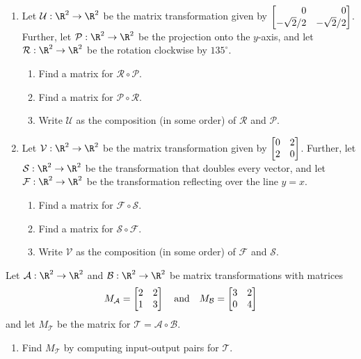 \begin{exercises}
	\begin{problist}
		\prob 
		\begin{enumerate}
			\item Let $\mathcal U:\R^{2}\to\R^{2}$ be the matrix transformation
				given by $\mat{0&0\\-\sqrt{2}/2 & -\sqrt{2}/2}$.
				Further, let $\mathcal P:\R^{2}\to\R^{2}$ be the
				projection onto the $y$-axis, and let $\mathcal R:\R^{2}\to\R^{2}$
				be the rotation clockwise by $135^{\circ}$.
				\begin{enumerate}
					\item Find a matrix for $\mathcal R \circ \mathcal P$.

					\item Find a matrix for $\mathcal P \circ \mathcal R$.

					\item Write $\mathcal U$ as the composition
						(in some order) of $\mathcal R$ and
						$\mathcal P$.
				\end{enumerate}

			\item Let $\mathcal V:\R^{2}\to\R^{2}$ be the matrix transformation
				given by $\mat{0&2\\2&0}$.
				Further, let $\mathcal S:\R^{2}\to\R^{2}$ be the
				transformation that doubles every vector, and let
				$\mathcal F:\R^{2}\to\R^{2}$ be the
				transformation reflecting over the line $y=x$.
				\begin{enumerate}
					\item Find a matrix for $\mathcal F \circ \mathcal S$.

					\item Find a matrix for $\mathcal S \circ \mathcal F$.

					\item Write $\mathcal V$ as the composition
						(in some order) of $\mathcal F$ and
						$\mathcal S$.
				\end{enumerate}
		\end{enumerate}

		\prob Let $\mathcal A: \R^{2} \to \R^{2}$ and
		$\mathcal B: \R^{2} \to \R^{2}$ be matrix transformations with
		matrices
		\[
			M_{\mathcal A}= \mat{2&2\\1&3}\quad \text{and} \quad M_{\mathcal
			B}= \mat{3&2\\0&4}
		\]
		 and let $M_{\mathcal T}$ be the matrix for $\mathcal T=\mathcal A\circ\mathcal B$.
		\begin{enumerate}
			\item Find $M_{\mathcal T}$ by computing input-output pairs for $\mathcal
				T$.


\end{enumerate}
\end{problist}
\end{exercises}
